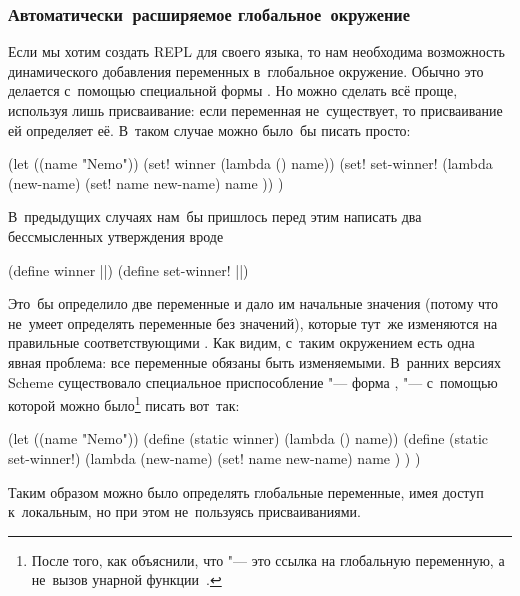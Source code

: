 \subsubsection{Автоматически~расширяемое глобальное~окружение}%
\label{assignment/assignment/free-vars/sssect:auto-extended}

Если мы хотим создать REPL для своего языка, то нам необходима возможность
динамического добавления переменных в~глобальное окружение. Обычно это делается
с~помощью специальной формы . Но можно сделать всё проще, используя
лишь присваивание: если переменная не~существует, то присваивание ей определяет
её. В~таком случае можно было~бы писать просто:

\begin{code:lisp}
(let ((name "Nemo"))
  (set! winner (lambda () name))
  (set! set-winner! (lambda (new-name) (set! name new-name)
                                       name )) )
\end{code:lisp}

В~предыдущих случаях нам~бы пришлось перед этим написать два бессмысленных
утверждения вроде

\begin{code:lisp}
(define winner      ||)
(define set-winner! ||)
\end{code:lisp}

Это~бы определило две переменные и дало им начальные значения (потому что
 не~умеет определять переменные без значений), которые тут~же
изменяются на правильные соответствующими . Как видим, с~таким
окружением есть одна явная проблема: все переменные обязаны быть изменяемыми.
В~ранних версиях Scheme \cite{ss78b} существовало специальное приспособление
"--- форма , "--- с~помощью которой можно было\footnote{После того,
как  объяснили, что  "--- это ссылка на
глобальную переменную, а не~вызов унарной функции~.} писать вот~так:

\begin{code:lisp}
(let ((name "Nemo"))
  (define (static winner) (lambda () name))
  (define (static set-winner!)
    (lambda (new-name) (set! name new-name)
                       name ) ) )
\end{code:lisp}

Таким образом можно было определять глобальные переменные, имея доступ
к~локальным, но при этом не~пользуясь присваиваниями.

